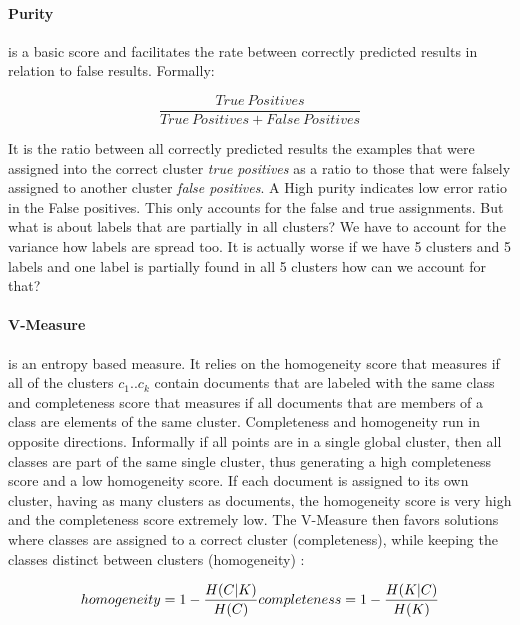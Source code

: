     \paragraph{Purity} is a basic score and facilitates the rate between correctly predicted results in relation to false results. Formally:

      \begin{equation}
        \frac{True\:Positives}{True\:Positives + False\:Positives}
      \end{equation}

    It is the ratio between all correctly predicted results the examples that were assigned into the correct cluster \emph{true positives} as a ratio to those that were falsely assigned to another cluster \emph{false positives}. A High purity indicates low error ratio in the False positives. This only accounts for the false and true assignments. But what is about labels that are partially in all clusters? We have to account for the variance how labels are spread too. It is actually worse if we have 5 clusters and 5 labels and one label is partially found in all 5 clusters how can we account for that?

    \paragraph{V-Measure} is an entropy based measure. It relies on the homogeneity score that measures if all of the clusters $c_1..c_k$ contain documents that are labeled with the same class and completeness score that measures if all documents that are members of a class are elements of the same cluster. Completeness and homogeneity run in opposite directions. Informally if all points are in a single global cluster, then all classes are part of the same single cluster, thus generating a high completeness score and a low homogeneity score. If each document is assigned to its own cluster, having as many clusters as documents, the homogeneity score is very high and the completeness score extremely low. The V-Measure then favors solutions where classes are assigned to a correct cluster (completeness), while keeping the classes distinct between clusters (homogeneity) \cite{VMeasure2007}:
      
      \begin{equation}
        homogeneity = 1 - \frac{H(C|K)}{H(C)}\\
        completeness = 1 - \frac{H(K|C)}{H(K)}
      \end{equation}

